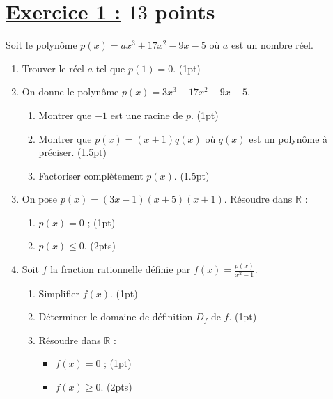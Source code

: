 \documentclass[12pt,a4paper]{article}
\begin{document}
\section*{\underline{Exercice 1 :} $13$ points}

Soit le polynôme \( p(x) = ax^3 + 17x^2 - 9x - 5 \) où \( a \) est un nombre réel.

\begin{enumerate}
    \item Trouver le réel \( a \) tel que \( p(1) = 0 \). \hfill (1pt)
    \item On donne le polynôme \( p(x) = 3x^3 + 17x^2 - 9x - 5 \).
        \begin{enumerate}
            \item Montrer que \(-1\) est une racine de \( p \). \hfill (1pt)
            \item Montrer que \( p(x) = (x + 1)q(x) \) où \( q(x) \) est un polynôme à préciser. \hfill (1.5pt)
            \item Factoriser complètement \( p(x) \). \hfill (1.5pt)
        \end{enumerate}
    \item On pose \( p(x) = (3x - 1)(x + 5)(x + 1) \). Résoudre dans \( \mathbb{R} \) :
        \begin{enumerate}
            \item \( p(x) = 0 \) ; \hfill (1pt)
            \item \( p(x) \leq 0 \). \hfill (2pts)
        \end{enumerate}
    \item Soit \( f \) la fraction rationnelle définie par \( f(x) = \frac{p(x)}{x^2 - 1} \).
        \begin{enumerate}
            \item Simplifier \( f(x) \). \hfill (1pt)
            \item Déterminer le domaine de définition \( D_f \) de \( f \). \hfill (1pt)
            \item Résoudre dans \( \mathbb{R} \) :
                \begin{itemize}
                    \item \( f(x) = 0 \) ; \hfill (1pt)
                    \item \( f(x) \geq 0 \). \hfill (2pts)
                \end{itemize}
        \end{enumerate}
\end{enumerate}
\end{document}
